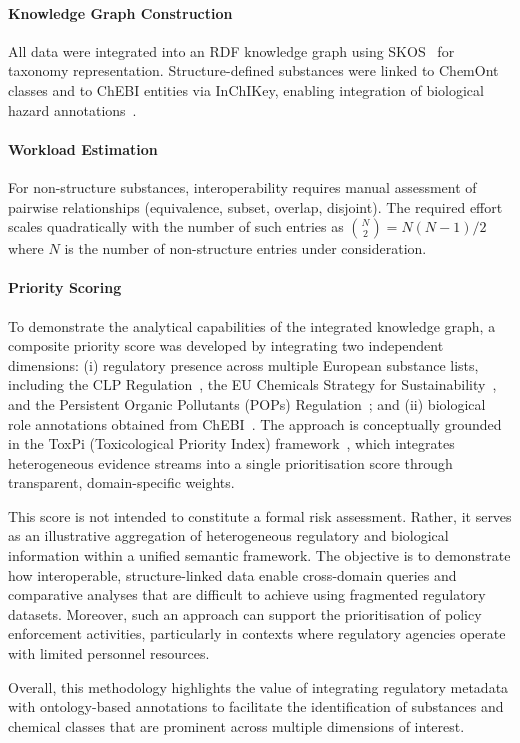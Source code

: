 \paragraph{Knowledge Graph Construction}

All data were integrated into an RDF knowledge graph using SKOS~\cite{W3C2009SKOS} for taxonomy
representation. Structure-defined substances were linked to ChemOnt classes and
to ChEBI entities via InChIKey, enabling integration of biological hazard
annotations~\cite{W3C2017OA}.

\paragraph{Workload Estimation}

For non-structure substances, interoperability requires manual assessment of
pairwise relationships (equivalence, subset, overlap, disjoint). The required
effort scales quadratically with the number of such entries as $\binom{N}{2} = N(N-1)/2$ where $N$ is the number of non-structure entries under consideration.

\paragraph{Priority Scoring}
\label{sec:priority_score}

To demonstrate the analytical capabilities of the integrated knowledge graph, a composite priority score was developed by integrating two independent dimensions: (i) regulatory presence across multiple European substance lists, including the CLP Regulation~\cite{CLP2008}, the EU Chemicals Strategy for Sustainability~\cite{EUCSS2020}, and the Persistent Organic Pollutants (POPs) Regulation~\cite{POPs2019}; and (ii) biological role annotations obtained from ChEBI~\cite{Degtyarenko2008}. The approach is conceptually grounded in the ToxPi (Toxicological Priority Index) framework~\cite{Reif2010}, which integrates heterogeneous evidence streams into a single prioritisation
score through transparent, domain-specific weights. 

This score is not intended to constitute a formal risk assessment. Rather, it serves as an illustrative aggregation of heterogeneous regulatory and biological information within a unified semantic framework. The objective is to demonstrate how interoperable, structure-linked data enable cross-domain queries and comparative analyses that are difficult to achieve using fragmented regulatory datasets. Moreover, such an approach can support the prioritisation of policy enforcement activities, particularly in contexts where regulatory agencies operate with limited personnel resources.

Overall, this methodology highlights the value of integrating regulatory metadata with ontology-based annotations to facilitate the identification of substances and chemical classes that are prominent across multiple dimensions of interest.
